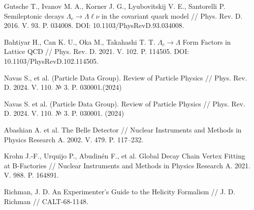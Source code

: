 \begin{thebibliography}{99}
    Gutsche T., Ivanov M. A., Korner J. G., Lyubovitskij V. E., Santorelli P. Semileptonic decays $\Lambda_c \to \Lambda \ell \nu$ in the covariant quark model // Phys. Rev. D. 2016. V. 93. P. 034008. DOI: 10.1103/PhysRevD.93.034008.    
    
    Bahtiyar H., Can K. U., Oka M., Takahashi T. T. $\Lambda_c \to \Lambda$ Form Factors in Lattice QCD // Phys. Rev. D. 2021. V. 102. P. 114505. DOI: 10.1103/PhysRevD.102.114505.    

    Navas S., et al. (Particle Data Group). Review of Particle Physics // Phys. Rev. D. 2024. V. 110. $№$ 3. P. 030001.(2024)
    
    Navas S. et al. (Particle Data Group). Review of Particle Physics // Phys. Rev. D. 2024. V. 110. № 3. P. 030001. (2024)

    Abashian A. et al. The Belle Detector // Nuclear Instruments and Methods in Physics Research A. 2002. V. 479. P. 117–232.
    
    Krohn J.-F., Urquijo P., Abudinén F., et al. Global Decay Chain Vertex Fitting at B-Factories // Nuclear Instruments and Methods in Physics Research A. 2021. V. 988. P. 164891.

    Richman, J. D. An Experimenter’s Guide to the Helicity Formalism // J. D. Richman // CALT-68-1148.


\end{thebibliography}
